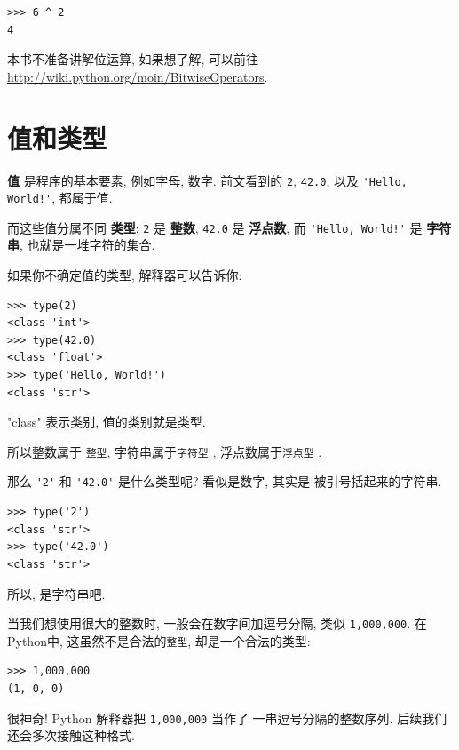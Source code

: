 \documentclass[10pt]{book}
\begin{document}
\begin{verbatim}
>>> 6 ^ 2
4
\end{verbatim}
%

本书不准备讲解位运算, 如果想了解, 可以前往 
\url{http://wiki.python.org/moin/BitwiseOperators}. 


\section{值和类型}


 {\bf 值} 是程序的基本要素, 例如字母, 数字. 前文看到的
 {\tt 2}, {\tt 42.0}, 以及 \verb"'Hello, World!'", 都属于值. 

而这些值分属不同 {\bf 类型}:
{\tt 2} 是 {\bf 整数}, 
{\tt 42.0} 是 {\bf 浮点数}, 
而 \verb"'Hello, World!'" 是 {\bf 字符串}, 也就是一堆字符的集合. 

如果你不确定值的类型, 解释器可以告诉你:

\begin{verbatim}
>>> type(2)
<class 'int'>
>>> type(42.0)
<class 'float'>
>>> type('Hello, World!')
<class 'str'>
\end{verbatim}
%

"class" 表示类别, 值的类别就是类型. 


所以整数属于 {\tt 整型}, 字符串属于{\tt 字符型} , 浮点数属于{\tt 浮点型} . 

那么 \verb"'2'" 和 \verb"'42.0'" 是什么类型呢? 看似是数字, 其实是
被引号括起来的字符串. 

\begin{verbatim}
>>> type('2')
<class 'str'>
>>> type('42.0')
<class 'str'>
\end{verbatim}
%
所以, 是字符串吧. 

当我们想使用很大的整数时, 一般会在数字间加逗号分隔, 类似 {\tt 1,000,000}. 
在Python中, 这虽然不是合法的{\tt 整型}, 却是一个合法的类型:

\begin{verbatim}
>>> 1,000,000
(1, 0, 0)
\end{verbatim}
%

很神奇! Python 解释器把 {\tt 1,000,000} 当作了
一串逗号分隔的整数序列. 后续我们还会多次接触这种格式. 
\end{document}

